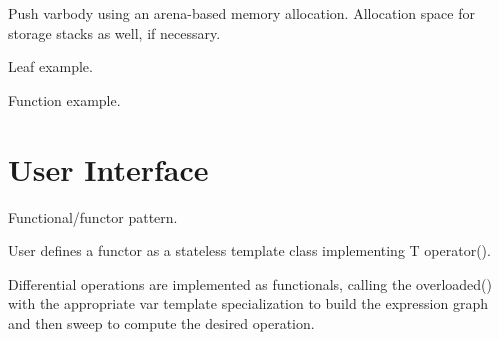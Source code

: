Push varbody using an arena-based memory allocation.
Allocation space for storage stacks as well, if necessary.

Leaf example.

Function example.

\section{User Interface}

Functional/functor pattern.

User defines a functor as a stateless template class implementing T operator().

Differential operations are implemented as functionals,
calling the overloaded() with the appropriate var template specialization
to build the expression graph and then sweep to compute the desired
operation.
